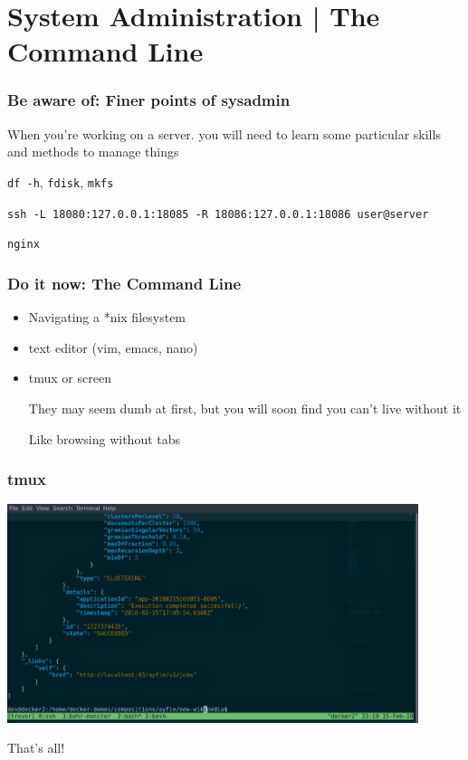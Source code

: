 \documentclass[10pt]{beamer}
\begin{document}
\section{System Administration | The Command Line}


\begin{frame}[c]
	\frametitle{Be aware of: Finer points of sysadmin}
	\pause
	When you're working on a server. you will need to learn some particular skills and methods to manage things

	\begin{description}[<+->]
		\item[Managing volumes] \texttt{df -h}, \texttt{fdisk}, \texttt{mkfs}
		\item[ssh tunnels and UDP] \texttt{ssh -L 18080:127.0.0.1:18085 -R 18086:127.0.0.1:18086 user@server}
		\item[web access control]  \texttt{nginx}
	\end{description}
\end{frame}


\begin{frame}[c]
	\frametitle{Do it now: The Command Line}
	\begin{itemize}[<+->]
		\item Navigating a *nix filesystem
		\item text editor (vim, emacs, nano)
		\item tmux or screen

		They may seem dumb at first, but you will soon find you can't live without it

		Like browsing without tabs
	\end{itemize}
\end{frame}

\begin{frame}[c]
	\frametitle{tmux}

	\centerline{\includegraphics[width=12cm]{tmux.png}}
\end{frame}









\begin{frame}[standout]
  That's all!
\end{frame}

\appendix
\end{document}
